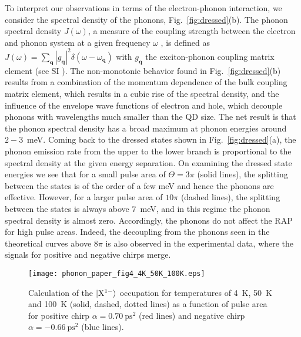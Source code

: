 \documentclass[aps,prl,reprint,superscriptaddress]{revtex4-1}
\begin{document}
To interpret our observations in terms of the electron-phonon interaction, we consider the spectral density of the phonons, Fig.~\ref{fig:dressed}(b). The phonon spectral density $J(\omega)$, a measure of the coupling strength between the electron and phonon system at a given frequency $\omega$ \cite{Reiter2014,wigger2014ene,machnikowski2004res}, is defined as $J(\omega)=\sum\limits_{\mathbf{q}} |g_{\mathbf{q}}|^2 \delta(\omega-\omega_{\mathbf{q}})$ with $g_{\mathbf{q}}$ the exciton-phonon coupling matrix element (see SI \cite{SI}). The non-monotonic behavior found in Fig.~\ref{fig:dressed}(b) results from a combination of the momentum dependence of the bulk coupling matrix element, which results in a cubic rise of the spectral density, and the influence of the envelope wave functions of electron and hole, which decouple phonons with wavelengths much smaller than the QD size. The net result is that the phonon spectral density has a broad maximum at phonon energies around $2-3$~meV. Coming back to the dressed states shown in Fig.~\ref{fig:dressed}(a), the phonon emission rate from the upper to the lower branch is proportional to the spectral density at the given energy separation. On examining the dressed state energies we see that for a small pulse area of $\Theta=3\pi$ (solid lines), the splitting between the states is of the order of a few meV and hence the phonons are effective. However, for a larger pulse area of $10\pi$ (dashed lines), the splitting between the states is always above $7$~meV, and in this regime the phonon spectral density is almost zero. Accordingly, the phonons do not affect the RAP for high pulse areas. Indeed, the decoupling from the phonons seen in the theoretical curves above $8\pi$ is also observed in the experimental data, where the signals for positive and negative chirps merge. 

\begin{figure}[t]{}
	\centering
	\texttt{[image: phonon\_paper\_fig4\_4K\_50K\_100K.eps]}
	\caption{Calculation of the $\ket{\mathrm{X}^{1-}}$ occupation for temperatures of 4~K, 50~K and 100~K (solid, dashed, dotted lines) as a function of pulse area for positive chirp $\alpha=\SI{+0.70 }{\pico\second\squared}$ (red lines) and negative chirp $\alpha=\SI{-0.66 }{\pico\second\squared}$ (blue lines).
	}
	\label{fig:temp}
\end{figure}
\end{document}
